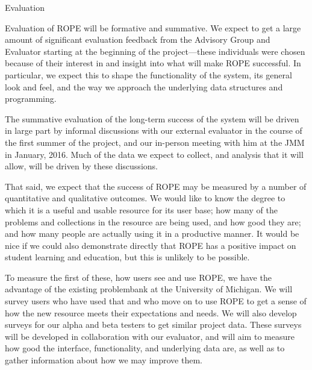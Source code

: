 \documentclass[11pt]{article}
\begin{document}
\begin{section}{Evaluation}

Evaluation of ROPE will be formative and summative.  We expect to get a
large amount of significant evaluation feedback from the Advisory
Group and Evaluator starting at the beginning of the
project---these individuals were chosen because of their interest in and
insight into what will make ROPE successful.  In particular, we expect
this to shape the functionality of the system, its general look and feel,
and the way we approach the underlying data structures and programming.  

The summative evaluation of the long-term success of the system will be
driven in large part by informal discussions with our external evaluator
in the course of the first summer of the project, and our in-person
meeting with him at the JMM in January, 2016.  Much of the data we expect to
collect, and analysis that it will allow, will be driven by these
discussions.  


That said, we expect that the success of ROPE may be measured by a number
of quantitative and qualitative outcomes.  We would like to know the
degree to which it is 
a useful and usable resource for its user base; how many of the problems
and collections in the resource are being used, and how good they are; and
how many people are actually using it in a productive manner.  It would be
nice if we could also demonstrate directly that ROPE has a positive impact
on student learning and education, but this is unlikely to be possible.

To measure the first of these, how users see and use ROPE, we have the
advantage of the existing problembank at the University of Michigan.  We
will survey users who have used that and who move on to use ROPE to get a
sense of how the new resource meets their expectations and needs.  We will
also develop surveys for our alpha and beta testers to get similar project
data.  These surveys will be developed in collaboration with our
evaluator, and will aim to measure how good the interface, functionality,
and underlying data are, as well as to gather information about how we may
improve them.


\end{section}
\end{document}
